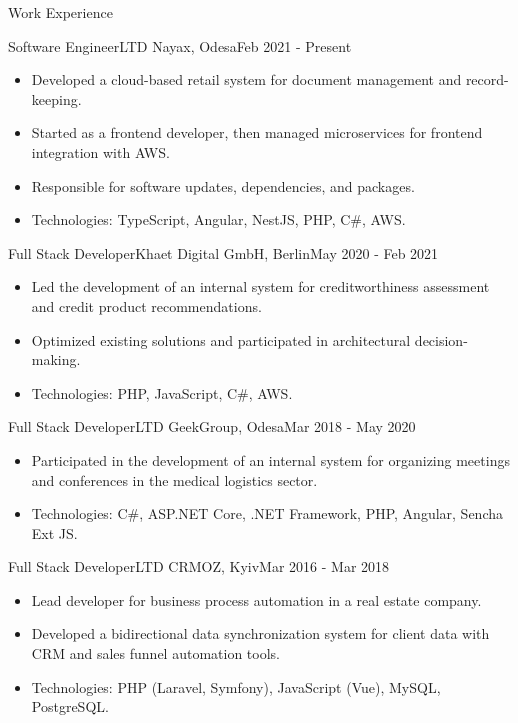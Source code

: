 \documentclass[]{mcdowellcv}
\begin{document}
\makeheader

\begin{cvsection}{Work Experience}
    \begin{cvsubsection}{Software Engineer}{LTD Nayax, Odesa}{Feb 2021 - Present}
        \begin{itemize}
            \item Developed a cloud-based retail system for document management and record-keeping.
            \item Started as a frontend developer, then managed microservices for frontend integration with AWS.
            \item Responsible for software updates, dependencies, and packages.
            \item Technologies: TypeScript, Angular, NestJS, PHP, C\#, AWS.
        \end{itemize}
    \end{cvsubsection}
    
    \begin{cvsubsection}{Full Stack Developer}{Khaet Digital GmbH, Berlin}{May 2020 - Feb 2021}
        \begin{itemize}
            \item Led the development of an internal system for creditworthiness assessment and credit product recommendations.
            \item Optimized existing solutions and participated in architectural decision-making.
            \item Technologies: PHP, JavaScript, C\#, AWS.
        \end{itemize}
    \end{cvsubsection}
    
    \begin{cvsubsection}{Full Stack Developer}{LTD GeekGroup, Odesa}{Mar 2018 - May 2020}
        \begin{itemize}
            \item Participated in the development of an internal system for organizing meetings and conferences in the medical logistics sector.
            \item Technologies: C\#, ASP.NET Core, .NET Framework, PHP, Angular, Sencha Ext JS.
        \end{itemize}
    \end{cvsubsection}
    
    \begin{cvsubsection}{Full Stack Developer}{LTD CRMOZ, Kyiv}{Mar 2016 - Mar 2018}
        \begin{itemize}
            \item Lead developer for business process automation in a real estate company.
            \item Developed a bidirectional data synchronization system for client data with CRM and sales funnel automation tools.
            \item Technologies: PHP (Laravel, Symfony), JavaScript (Vue), MySQL, PostgreSQL.
        \end{itemize}
    \end{cvsubsection}
    

\end{cvsection}
\end{document}
